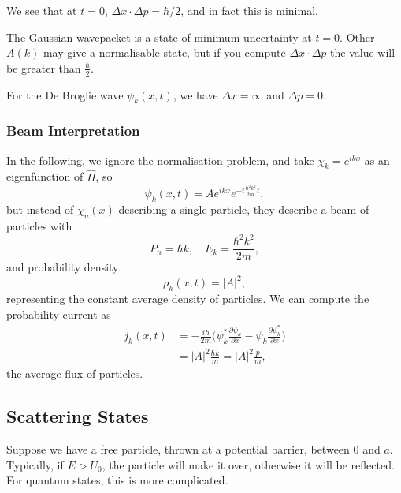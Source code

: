 \documentclass[12pt]{article}
\begin{document}

We see that at $t = 0$, $\Delta x \cdot \Delta p = \hbar/2$, and in fact this is minimal.

The Gaussian wavepacket is a state of minimum uncertainty at $t = 0$. Other $A(k)$ may give a normalisable state, but if you compute $\Delta x \cdot \Delta p$ the value will be greater than $\frac{\hbar}{2}$.

For the De Broglie wave $\psi_k(x, t)$, we have $\Delta x = \infty$ and $\Delta p = 0$.

\subsubsection{Beam Interpretation}%
\label{subsub:beam_interpretation}

In the following, we ignore the normalisation problem, and take $\chi_k = e^{ikx}$ as an eigenfunction of $\hat H$, so
\[
	\psi_k(x, t) = A e^{ikx} e^{-i \frac{\hbar^2 k^2}{2m} t}
,\]
but instead of $\chi_n(x)$ describing a single particle, they describe a beam of particles with
\[
	P_n = \hbar k, \quad E_k = \frac{\hbar^2 k^2}{2m}
,\]
and probability density
\[
	\rho_k(x, t) = |A|^2
,\]
representing the constant average density of particles. We can compute the probability current as
\begin{align*}
	j_k(x, t) &= -\frac{i\hbar}{2m} \biggl( \psi_k^{\ast} \frac{\partial \psi_k}{\partial x} - \psi_k \frac{\partial \psi^{\ast}_k}{\partial x} \biggr) \\
		  &= |A|^2 \frac{\hbar k}{m} = |A|^2 \frac{p}{m},
\end{align*}
the average flux of particles.

\subsection{Scattering States}%
\label{sub:scattering_states}

Suppose we have a free particle, thrown at a potential barrier, between $0$ and $a$. Typically, if $E > U_0$, the particle will make it over, otherwise it will be reflected. For quantum states, this is more complicated.
\end{document}
